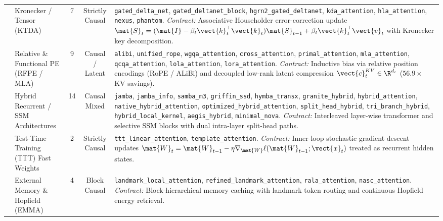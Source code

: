 \begin{table}[t]
{\begin{tabular}{@{}llccp{9.4cm}@{}}
\addlinespace[2pt]
9  & Kronecker / Tensor (KTDA)& 7  & Strictly Causal & \texttt{gated\_delta\_net}, \texttt{gated\_deltanet\_block}, \texttt{hgrn2\_gated\_deltanet}, \texttt{kda\_attention}, \texttt{hla\_attention}, \texttt{nexus}, \texttt{phantom}. \newline \textit{Contract:} Associative Householder error-correction update $\mat{S}_t = (\mat{I} - \beta_t \vect{k}_t^\top \vect{k}_t)\mat{S}_{t-1} + \beta_t \vect{k}_t^\top \vect{v}_t$ with Kronecker key decomposition. \\
\addlinespace[2pt]
10 & Relative \& Functional PE (RFPE / MLA) & 9  & Causal / Latent & \texttt{alibi}, \texttt{unified\_rope}, \texttt{wgqa\_attention}, \texttt{cross\_attention}, \texttt{primal\_attention}, \texttt{mla\_attention}, \texttt{qcqa\_attention}, \texttt{lola\_attention}, \texttt{lora\_attention}. \newline \textit{Contract:} Inductive bias via relative position encodings (RoPE / ALiBi) and decoupled low-rank latent compression $\vect{c}_t^{KV} \in \R^{d_c}$ ($56.9\times$ KV savings). \\
\addlinespace[2pt]
11 & Hybrid Recurrent / SSM Architectures & 14 & Causal Mixed & \texttt{jamba}, \texttt{jamba\_info}, \texttt{samba\_m3}, \texttt{griffin\_ssd}, \texttt{hymba\_transx}, \texttt{granite\_hybrid}, \texttt{hybrid\_attention}, \texttt{native\_hybrid\_attention}, \texttt{optimized\_hybrid\_attention}, \texttt{split\_head\_hybrid}, \texttt{tri\_branch\_hybrid}, \texttt{hybrid\_local\_kernel}, \texttt{aegis\_hybrid}, \texttt{minimal\_nova}. \newline \textit{Contract:} Interleaved layer-wise transformer and selective SSM blocks with dual intra-layer split-head paths. \\
\addlinespace[2pt]
12 & Test-Time Training (TTT) Fast Weights& 2  & Strictly Causal & \texttt{ttt\_linear\_attention}, \texttt{template\_attention}. \newline \textit{Contract:} Inner-loop stochastic gradient descent updates $\mat{W}_t = \mat{W}_{t-1} - \eta \nabla_\mat{W} \ell(\mat{W}_{t-1}; \vect{x}_t)$ treated as recurrent hidden states. \\
\addlinespace[2pt]
13 & External Memory \& Hopfield (EMMA)   & 4  & Block Causal & \texttt{landmark\_local\_attention}, \texttt{refined\_landmark\_attention}, \texttt{rala\_attention}, \texttt{nasc\_attention}. \newline \textit{Contract:} Block-hierarchical memory caching with landmark token routing and continuous Hopfield energy retrieval. \\

\end{tabular}}
\end{table}
